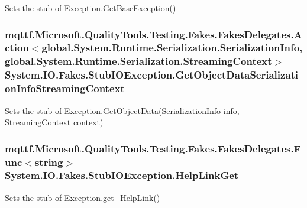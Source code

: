 Sets the stub of Exception.\-Get\-Base\-Exception()

\hypertarget{class_system_1_1_i_o_1_1_fakes_1_1_stub_i_o_exception_a289e1ea27c903744a4a88e3e0f24e040}{
\subsubsection[{Get\-Object\-Data\-Serialization\-Info\-Streaming\-Context}]{\setlength{\rightskip}{0pt plus 5cm}mqttf.\-Microsoft.\-Quality\-Tools.\-Testing.\-Fakes.\-Fakes\-Delegates.\-Action$<$global.\-System.\-Runtime.\-Serialization.\-Serialization\-Info, global.\-System.\-Runtime.\-Serialization.\-Streaming\-Context$>$ System.\-I\-O.\-Fakes.\-Stub\-I\-O\-Exception.\-Get\-Object\-Data\-Serialization\-Info\-Streaming\-Context}}\label{class_system_1_1_i_o_1_1_fakes_1_1_stub_i_o_exception_a289e1ea27c903744a4a88e3e0f24e040}


Sets the stub of Exception.\-Get\-Object\-Data(\-Serialization\-Info info, Streaming\-Context context)

\hypertarget{class_system_1_1_i_o_1_1_fakes_1_1_stub_i_o_exception_ab6998642ee6f4225a968145a41b020d8}{
\subsubsection[{Help\-Link\-Get}]{\setlength{\rightskip}{0pt plus 5cm}mqttf.\-Microsoft.\-Quality\-Tools.\-Testing.\-Fakes.\-Fakes\-Delegates.\-Func$<$string$>$ System.\-I\-O.\-Fakes.\-Stub\-I\-O\-Exception.\-Help\-Link\-Get}}\label{class_system_1_1_i_o_1_1_fakes_1_1_stub_i_o_exception_ab6998642ee6f4225a968145a41b020d8}


Sets the stub of Exception.\-get\-\_\-\-Help\-Link()

